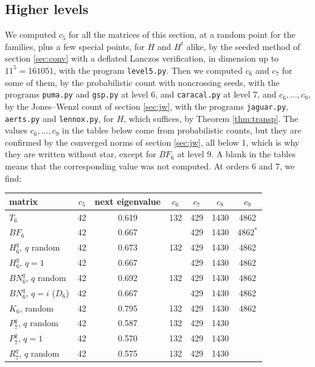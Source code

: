 \documentclass[11pt]{amsart}
\begin{document}
\subsection{Higher levels}\label{sec:level5}

We computed $c_5$ for all the matrices of this section, at a random point for the families, plus a few special points, for $H$ and $H^t$ alike, by the seeded method of section \ref{sec:conv} with a deflated Lanczos verification, in dimension up to $11^5=161051$, with the program \texttt{level5.py}. Then we computed $c_6$ and $c_7$ for some of them, by the probabilistic count with noncrossing seeds, with the programs \texttt{puma.py} and \texttt{gsp.py} at level 6, and \texttt{caracal.py} at level 7, and $c_6,\ldots,c_9$, by the Jones--Wenzl count of section \ref{sec:jw}, with the programs \texttt{jaguar.py}, \texttt{aerts.py} and \texttt{lennox.py}, for $H$, which suffices, by Theorem \ref{thm:transp}. The values $c_6,\ldots,c_9$ in the tables below come from probabilistic counts, but they are confirmed by the converged norms of section \ref{sec:jw}, all below 1, which is why they are written without star, except for $BF_6$ at level 9. A blank in the tables means that the corresponding value was not computed. At orders 6 and 7, we find:

\medskip

\begin{center}
\begin{tabular}{lcccccc}
\toprule
matrix & $c_5$ & next eigenvalue & $c_6$ & $c_7$ & $c_8$ & $c_9$\\
\midrule
$T_6$ & 42 & 0.619 & 132 & 429 & 1430 & 4862\\
$BF_6$ & 42 & 0.667 &  & 429 & 1430 & $4862^*$\\
$H_6^q$, $q$ random & 42 & 0.673 & 132 & 429 & 1430 & 4862\\
$H_6^q$, $q=1$ & 42 & 0.667 &  & 429 & 1430 & 4862\\
$BN_6^q$, $q$ random & 42 & 0.692 & 132 & 429 & 1430 & 4862\\
$BN_6^q$, $q=i$ ($D_6$) & 42 & 0.667 &  & 429 & 1430 & 4862\\
$K_6$, random & 42 & 0.795 & 132 & 429 & 1430 & 4862\\
$P_7^q$, $q$ random & 42 & 0.587 & 132 & 429 & 1430 & \\
$P_7^q$, $q=1$ & 42 & 0.570 & 132 & 429 & 1430 & \\
$R_7^q$, $q$ random & 42 & 0.575 & 132 & 429 & 1430 & \\
\bottomrule
\end{tabular}
\end{center}
\end{document}
